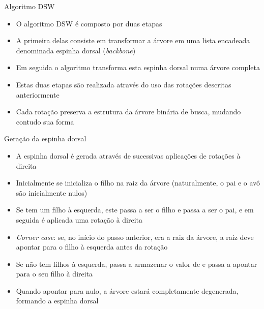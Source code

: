 \begin{frame}{Algoritmo DSW}

	\begin{itemize}
		\item O algoritmo DSW é composto por duas etapas

        \item A primeira delas consiste em {transformar} a árvore em uma lista encadeada 
            denominada {espinha dorsal} (\textit{backbone})

        \item Em seguida o algoritmo transforma esta espinha dorsal numa árvore completa

		\item Estas duas etapas são realizada através do uso das {rotações} descritas anteriormente

        \item Cada rotação preserva a estrutura da árvore binária de busca, mudando contudo sua
            forma
	\end{itemize}

\end{frame}

\begin{frame}[fragile]{Geração da espinha dorsal}

    \begin{itemize}
        \item A espinha dorsal é gerada através de sucessivas aplicações de rotações à direita

        \item Inicialmente se inicializa o filho  na raiz da árvore 
            (naturalmente, o pai  e o avô  são inicialmente nulos)

        \item Se  tem um filho à esquerda, este passa a ser o filho e  passa
            a ser o pai, e em seguida é aplicada uma rotação à direita

        \item \textit{Corner case}: se, no início do passo anterior,  era a raiz da
            árvore, a raiz deve apontar para o filho à esquerda antes da rotação

        \item Se  não tem filhos à esquerda, 
             passa a armazenar o valor de  e 
            passa a apontar para o seu filho à direita

        \item Quando  apontar para nulo, a árvore estará completamente degenerada,
            formando a espinha dorsal
    \end{itemize}

\end{frame}

